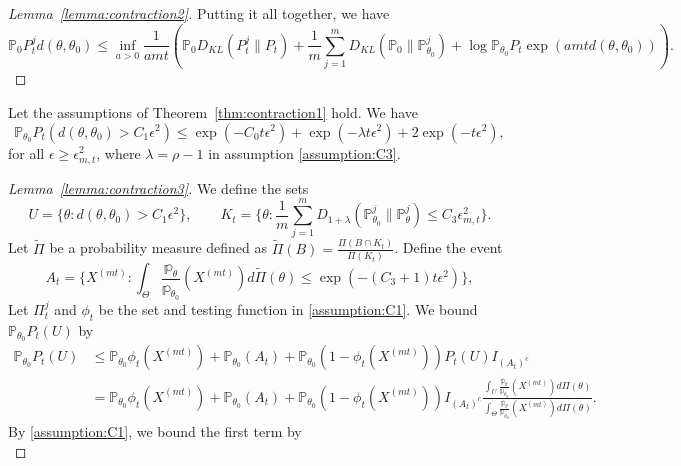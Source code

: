 \documentclass[twoside,11pt]{article}
\numberwithin{equation}{section}
\newcommand\bP{\mathbb{P}}
\newcommand\bp{\mathbb{p}}
\begin{document}
{\begin{proof}[Lemma~\ref{lemma:contraction2}]
 Putting it all together, we have
 \begin{equation*}
    \bP_0 P_t^jd(\theta, \theta_0) \leq  \inf_{a > 0} \frac{1}{a mt} \left(\bP_0 D_{KL}(P_t^j \parallel P_t) +  \frac{1}{m} \sum_{j = 1}^m D_{KL}(\bP_0 \parallel \bP_{\theta_0}^j) +  \log \bP_{\theta_0} P_t\exp\left(amt d(\theta, \theta_0) \right) \right) . 
 \end{equation*}
\end{proof}
\begin{lemma}\label{lemma:contraction3}
   Let the assumptions of Theorem~\ref{thm:contraction1} hold. We have
   \begin{equation*}
    \bP_{\theta_0} P_t(d(\theta, \theta_0) > C_1 \epsilon^2) \leq  \exp(-C_0 t \epsilon^2) + \exp(-\lambda t \epsilon^2) + 2 \exp(-t \epsilon^2), 
   \end{equation*}
   for all $\epsilon \geq \epsilon_{m,t}^2$, where $\lambda = \rho -1$ in assumption \eqref{assumption:C3}. 
\end{lemma}
\begin{proof}[Lemma~\ref{lemma:contraction3}]
    We define the sets
\begin{equation*}
    U = \{\theta: d(\theta, \theta_0)  > C_1 \epsilon^2\}, \qquad K_t = \{\theta: \frac{1}{m}\sum_{j = 1}^m D_{1 + \lambda}(\bP_{\theta_0}^j \parallel \bP_\theta^j) \leq C_3 \epsilon_{m,t}^2\}. 
\end{equation*}
Let $\tilde \Pi$ be a probability measure defined as $\tilde \Pi(B) = \frac{\Pi(B \cap K_t)}{\Pi(K_t)}$.  Define the event
\begin{equation*}
    A_t = \{X^{(mt)}: \int_\Theta \frac{\bp_\theta}{\bp_{\theta_0}}(X^{(mt)}) d \tilde \Pi(\theta) \leq \exp(-(C_3 + 1) t \epsilon^2)\}, 
\end{equation*}
Let $\Pi_t^j$ and $\phi_t$ be the set and testing function in \eqref{assumption:C1}. We bound $\bP_{\theta_0}  P_t (U)$ by 
\begin{align*}
     \bP_{\theta_0}  P_t (U)& \leq \bP_{\theta_0} \phi_t(X^{(mt)}) + \bP_{\theta_0}(A_t) + \bP_{\theta_0} (1 - \phi_t(X^{(mt)})) P_t(U) I_{(A_t)^c} \\
     &= \bP_{\theta_0} \phi_t(X^{(mt)}) 
     + \bP_{\theta_0}(A_t) 
     + \bP_{\theta_0} (1 - \phi_t(X^{(mt)})) I_{(A_t)^c} \frac{\int_{U} \frac{\bp_\theta}{\bp_{\theta_0}}(X^{(mt)}) d \Pi(\theta)}{\int_{\Theta} \frac{\bp_\theta}{\bp_{\theta_0}}(X^{(mt)}) d \Pi(\theta)}. 
\end{align*}
By \eqref{assumption:C1}, we bound the first term by
\begin{equation*}

\end{equation*}
\end{proof}}
\end{document}
